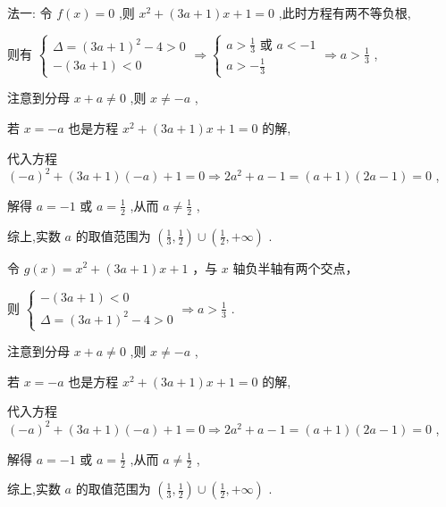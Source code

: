 \documentclass[10pt]{article}
\begin{document}
法一: 令 \(f\left( x\right)  = 0\) ,则 \({x}^{2} + \left( {{3a} + 1}\right) x + 1 = 0\) ,此时方程有两不等负根,

则有 \(\left\{  {\begin{array}{l} \Delta  = {\left( 3a + 1\right) }^{2} - 4 > 0 \\   - \left( {{3a} + 1}\right)  < 0 \end{array} \Rightarrow  \left\{  {\begin{array}{l} a > \frac{1}{3}\text{ 或 }a <  - 1 \\  a >  - \frac{1}{3} \end{array} \Rightarrow  a > \frac{1}{3}}\right. }\right.\) ,

注意到分母 \(x + a \neq  0\) ,则 \(x \neq   - a\) ,

若 \(x =  - a\) 也是方程 \({x}^{2} + \left( {{3a} + 1}\right) x + 1 = 0\) 的解,

代入方程 \({\left( -a\right) }^{2} + \left( {{3a} + 1}\right) \left( {-a}\right)  + 1 = 0 \Rightarrow  2{a}^{2} + a - 1 = \left( {a + 1}\right) \left( {{2a} - 1}\right)  = 0\) ,

解得 \(a =  - 1\) 或 \(a = \frac{1}{2}\) ,从而 \(a \neq  \frac{1}{2}\) ,

综上,实数 \(a\) 的取值范围为 \(\left( {\frac{1}{3},\frac{1}{2}}\right)  \cup  \left( {\frac{1}{2}, + \infty }\right)\) .

令 \(g\left( x\right)  = {x}^{2} + \left( {{3a} + 1}\right) x + 1\) ，与 \(x\) 轴负半轴有两个交点，

则 \(\left\{  {\begin{array}{l}  - \left( {{3a} + 1}\right)  < 0 \\  \Delta  = {\left( 3a + 1\right) }^{2} - 4 > 0 \end{array} \Rightarrow  a > \frac{1}{3}}\right.\) .

注意到分母 \(x + a \neq  0\) ,则 \(x \neq   - a\) ,

若 \(x =  - a\) 也是方程 \({x}^{2} + \left( {{3a} + 1}\right) x + 1 = 0\) 的解,

代入方程 \({\left( -a\right) }^{2} + \left( {{3a} + 1}\right) \left( {-a}\right)  + 1 = 0 \Rightarrow  2{a}^{2} + a - 1 = \left( {a + 1}\right) \left( {{2a} - 1}\right)  = 0\) ,

解得 \(a =  - 1\) 或 \(a = \frac{1}{2}\) ,从而 \(a \neq  \frac{1}{2}\) ,

综上,实数 \(a\) 的取值范围为 \(\left( {\frac{1}{3},\frac{1}{2}}\right)  \cup  \left( {\frac{1}{2}, + \infty }\right)\) .
\end{document}
